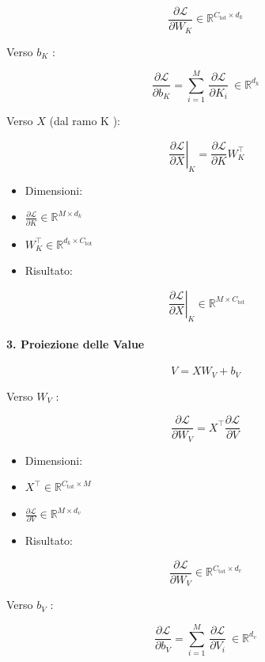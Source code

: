 \documentclass[
  11pt,
]{article}
\begin{document}
\[\frac{\partial\mathcal{L}}{\partial W_{K}} \in \mathbb{R}^{C_{\text{tot}} \times d_{k}}\]

Verso \(b_{K}\) :

\[\frac{\partial\mathcal{L}}{\partial b_{K}} = \sum_{i = 1}^{M}\,\frac{\partial\mathcal{L}}{\partial K_{i}}\  \in \mathbb{R}^{d_{k}}\]

Verso \(X\) (dal ramo K ):

\[\left. \ \frac{\partial\mathcal{L}}{\partial X} \right|_{K} = \frac{\partial\mathcal{L}}{\partial K}W_{K}^{\top}\]

\begin{itemize}
\item
  Dimensioni:
\item
  \(\frac{\partial\mathcal{L}}{\partial K} \in \mathbb{R}^{M \times d_{k}}\)
\item
  \(W_{K}^{\top} \in \mathbb{R}^{d_{k} \times C_{\text{tot}}}\)
\item
  Risultato:
\end{itemize}

\[\left. \ \frac{\partial\mathcal{L}}{\partial X} \right|_{K} \in \mathbb{R}^{M \times C_{\text{tot}}}\]

\paragraph{3. Proiezione delle Value}

\[V = XW_{V} + b_{V}\]

Verso \(W_{V}\) :

\[\frac{\partial\mathcal{L}}{\partial W_{V}} = X^{\top}\frac{\partial\mathcal{L}}{\partial V}\]

\begin{itemize}
\item
  Dimensioni:
\item
  \(X^{\top} \in \mathbb{R}^{C_{\text{tot}} \times M}\)
\item
  \(\frac{\partial\mathcal{L}}{\partial V} \in \mathbb{R}^{M \times d_{v}}\)
\item
  Risultato:
\end{itemize}

\[\frac{\partial\mathcal{L}}{\partial W_{V}} \in \mathbb{R}^{C_{\text{tot}} \times d_{v}}\]

Verso \(b_{V}\) :

\[\frac{\partial\mathcal{L}}{\partial b_{V}} = \sum_{i = 1}^{M}\,\frac{\partial\mathcal{L}}{\partial V_{i}}\  \in \mathbb{R}^{d_{v}}\]
\end{document}
